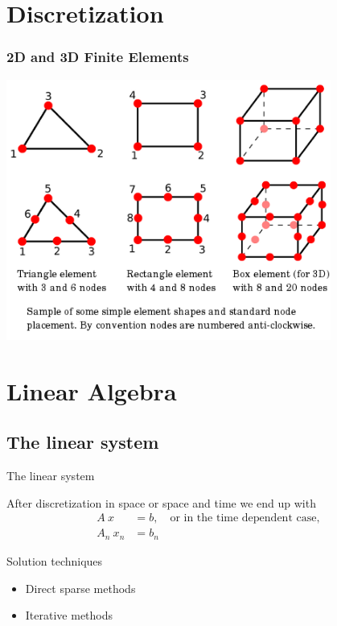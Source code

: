 \documentclass[handout]{beamer}
{
\usepackage{fullpage}
\usepackage{hyperref}
\usepackage{amssymb} 
}
\begin{document}
\section{Discretization}


\begin{frame}
\frametitle{2D and 3D Finite Elements}
\includegraphics[width=0.8\textwidth]{figures/FiniteElements.png}
\end{frame}



\section{Linear Algebra}
\subsection{The linear system}

\begin{frame}{The linear system}
\begin{block}{After discretization in space or space and time we end up with}
\begin{align*}
           A\: x &= b, \quad \text{or in the time dependent case}, \\
           A_n\: x_n &= b_n
\end{align*}
\end{block}

\begin{block}{Solution techniques}
\begin{itemize}
\item Direct sparse methods
\item Iterative methods
\end{itemize}
\end{block}
\end{frame}
\end{document}
